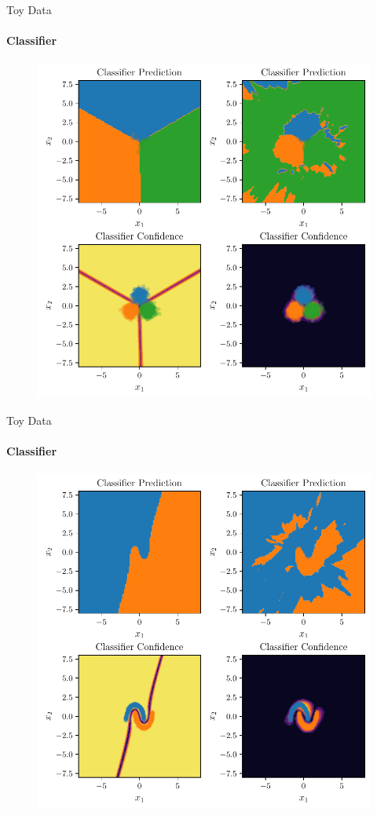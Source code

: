 \documentclass[aspectratio=169]{beamer}
\begin{document}
\begin{frame}{Toy Data}
    \framesubtitle{Classifier}
    \begin{figure}
        \includegraphics[height=0.7\textheight]{beamer-figures/toy_example/gaussian_mixture/classifier.pdf}
    \end{figure}
\end{frame}
\begin{frame}{Toy Data}
    \framesubtitle{Classifier}
    \begin{figure}
        \includegraphics[height=0.7\textheight]{beamer-figures/toy_example/moons/classifier.pdf}
    \end{figure}
\end{frame}
\end{document}
